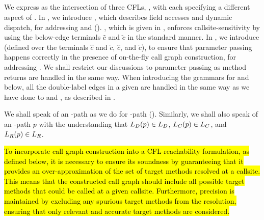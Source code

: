 \subsection{\texorpdfstring{\LFCR}{}}
\label{subsec:newCFLs}


We  express
\LFCR   as the intersection of three CFLs, \capLFCR, 
with each  specifying a
different aspect of . 
In  , we  introduce \LF,
which describes  field accesses and
dynamic dispatch, for addressing
 and  (). 
\LC, which is given in ,  
 enforces callsite-sensitivity by using the
 below-edge terminals $\hat{c}$ and
$\check{c}$
 in the standard manner.
In  ,
we  introduce \LR (defined over the terminals $\hat{c}$ and
$\check{c}$, $\hat{\boxed{c}}$, and
$\check{\boxed{c}}$), to
  ensure  that parameter passing happens correctly 
in the presence of on-the-fly call
graph construction, for addressing
 . We shall restrict our discussions to parameter passing  as method
 returns are handled in the same way. 
 When introducing the grammars for \LF and \LR below,
all the double-label \pag edges in a given \pag
are handled in the same way as we have done to \manuLF and \manuLC,
as described in
 .

We shall speak of an \LFC-path as we do for \manuLFC-path (). Similarly, we shall
also speak of an \LFCR-path $p$ with the understanding that  
$\mbox{${L}_D$}(p)\in \mbox{${L}_D$}$, 
$\mbox{${L}_C$}(p)\in \mbox{${L}_C$}$, and
$\mbox{${L}_R$}(p)\in \mbox{${L}_R$}$. 

\hl{
To incorporate call graph construction into a CFL-reachability formulation, as defined below, it is necessary to ensure its soundness by guaranteeing that it provides an over-approximation of the set of target methods resolved at a callsite. This means that the constructed call graph should include all possible target methods that could be called at a given callsite. Furthermore, precision is maintained by excluding any spurious target methods from the resolution, ensuring that only relevant and accurate target methods are considered. 
}

